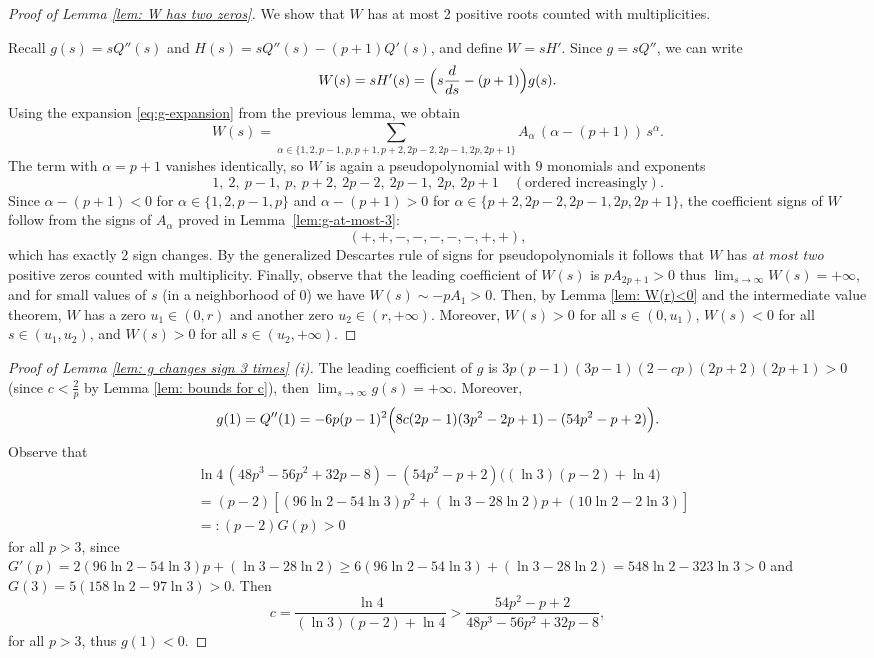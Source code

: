 \documentclass[11pt]{article}
\theoremstyle{definition}
\newcommand{\1}{\mathbf{1}}
\begin{document}
\begin{proof}[Proof of Lemma \ref{lem: W has two zeros}]
We show that $W$ has at most 2 positive roots counted with multiplicities. 

  Recall $g(s)=sQ''(s)$ and $H(s)=sQ''(s)-(p+1)Q'(s)$, and define $W=sH'$.
Since $g=sQ''$, we can write
\[
W(s)=sH'(s)=\Bigl(s\frac{d}{ds}-(p+1)\Bigr)g(s).
\]
Using the expansion \eqref{eq:g-expansion} from the previous lemma, we obtain
\[
W(s)=\sum_{\alpha\in\{1,2,p-1,p,p+1,p+2,2p-2,2p-1,2p,2p+1\}}
A_{\alpha}\,(\alpha-(p+1))\,s^{\alpha}.
\]
The term with $\alpha=p+1$ vanishes identically, so $W$ is again a pseudopolynomial
with $9$ monomials and exponents
\[
1,\ 2,\ p-1,\ p,\ p+2,\ 2p-2,\ 2p-1,\ 2p,\ 2p+1
\quad(\text{ordered increasingly}).
\]
Since $\alpha-(p+1)<0$ for $\alpha\in\{1,2,p-1,p\}$ and $\alpha-(p+1)>0$ for
$\alpha\in\{p+2,2p-2,2p-1,2p,2p+1\}$, the coefficient signs of $W$ follow from the
signs of $A_{\alpha}$ proved in Lemma~\ref{lem:g-at-most-3}:
\[
(+,+,-,-,-,-,-,+,+),
\]
which has exactly $2$ sign changes. By the generalized Descartes rule of signs for
pseudopolynomials it follows that $W$ has \emph{at most two} positive zeros counted with multiplicity. Finally, observe that the leading coefficient of $W(s)$ is $pA_{2p+1}>0$ thus $\lim_{s\to\infty} W(s)=+\infty$, and for small values of $s$ (in a neighborhood of $0$) we have $W(s)\sim -pA_1>0$. Then, by Lemma \ref{lem: W(r)<0} and the intermediate value theorem, $W$ has a zero $u_1\in(0,r)$ and another zero $u_2\in(r,+\infty)$. Moreover,
$W(s)>0$ for all $s\in(0,u_1)$, $W(s)<0$ for all $s\in(u_1,u_2)$, and $W(s)>0$ for all $s\in(u_2,+\infty)$. 

\end{proof}


\begin{proof}[Proof of Lemma \ref{lem: g changes sign 3 times} \textup{(i)}]

The leading coefficient of $g$ is $3p(p-1)(3p-1)(2-cp)(2p+2)(2p+1)>0$ (since $c<\frac{2}{p}$ by Lemma \ref{lem: bounds for c}), then
$\lim_{s\to\infty}g(s)=+\infty$. Moreover,
$$
g(1)=Q''(1)
= -6p(p-1)^2\Bigl(8c(2p-1)(3p^2-2p+1)-(54p^2-p+2)\Bigr).
$$
Observe that
\begin{align*}
&\ln 4\,(48p^3-56p^2+32p-8)-(54p^2-p+2)\big((\ln 3)(p-2)+\ln 4\big)\\
&=(p-2)[(96\ln 2-54\ln 3)p^2+(\ln 3-28\ln 2)p+(10\ln 2-2\ln 3)]\\
&=:(p-2)G(p)>0
\end{align*}
for all $p>3$, since $G'(p)=2(96\ln 2-54\ln 3)p+(\ln 3-28\ln 2)\geq 6(96\ln 2-54\ln 3)+(\ln 3-28\ln 2)=548\ln 2-323\ln 3>0$ and $G(3)=5(158\ln 2-97\ln 3)>0$. Then 
$$
c=\frac{\ln 4}{(\ln 3)(p-2)+\ln 4}>\frac{54p^2-p+2}{48p^3-56p^2+32p-8},
$$
for all $p>3$, thus $g(1)<0$.

\end{proof}
\end{document}
